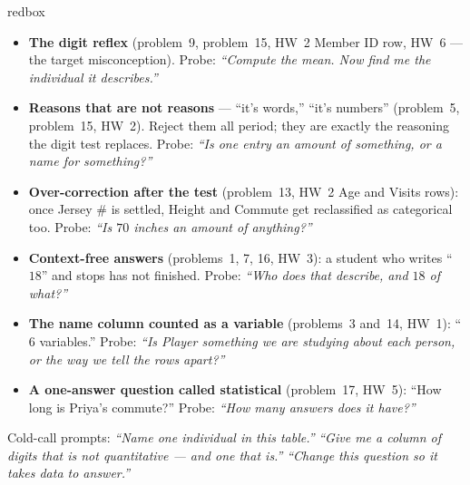 \documentclass[10pt]{article}
\begin{document}
\boxguard
\begin{skillbox}{redbox}
\begin{itemize}[leftmargin=1.2em, nosep]
  \item \textbf{The digit reflex} (problem~9, problem~15, HW~2 Member ID row, HW~6 --- the
        target misconception). Probe: \emph{``Compute the mean. Now find me the individual it
        describes.''}
  \item \textbf{Reasons that are not reasons} --- ``it's words,'' ``it's numbers'' (problem~5,
        problem~15, HW~2). Reject them all period; they are exactly the reasoning the digit
        test replaces. Probe: \emph{``Is one entry an amount of something, or a name for
        something?''}
  \item \textbf{Over-correction after the test} (problem~13, HW~2 Age and Visits rows): once
        Jersey \# is settled, Height and Commute get reclassified as categorical too. Probe:
        \emph{``Is $70$ inches an amount of anything?''}
  \item \textbf{Context-free answers} (problems~1, 7, 16, HW~3): a student who writes ``$18$''
        and stops has not finished. Probe: \emph{``Who does that describe, and $18$ of
        what?''}
  \item \textbf{The name column counted as a variable} (problems~3 and~14, HW~1): ``$6$
        variables.'' Probe: \emph{``Is \emph{Player} something we are studying about each
        person, or the way we tell the rows apart?''}
  \item \textbf{A one-answer question called statistical} (problem~17, HW~5): ``How long is
        Priya's commute?'' Probe: \emph{``How many answers does it have?''}
\end{itemize}
Cold-call prompts: \emph{``Name one individual in this table.''} \quad \emph{``Give me a
column of digits that is \emph{not} quantitative --- and one that is.''} \quad \emph{``Change
this question so it takes data to answer.''}
\end{skillbox}
\end{document}
